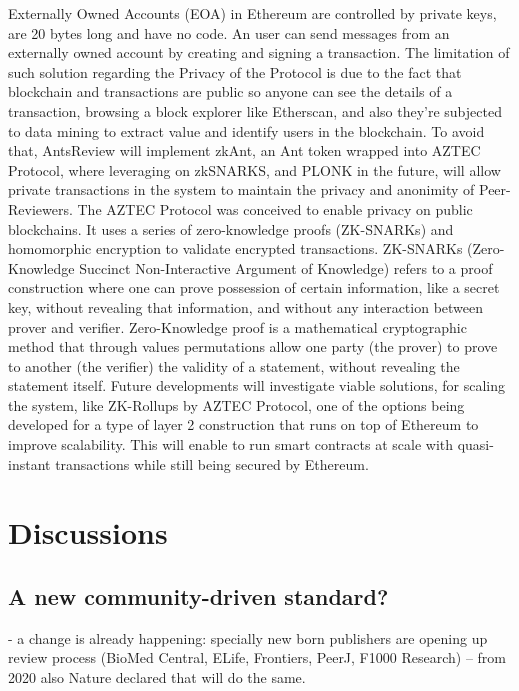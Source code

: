 \documentclass[runningheads]{llncs}
\begin{document}
 Externally Owned Accounts (EOA) in Ethereum are controlled by private keys, are 20 bytes long and have no code. An user can send messages from an externally owned account by creating and signing a transaction.
\newline The limitation of such solution regarding the Privacy of the Protocol is due to the fact that blockchain and transactions are public so anyone can see the details of a transaction, browsing a block explorer like Etherscan, and also they're subjected to data mining to extract value and identify users in the blockchain.
\newline To avoid that, AntsReview will implement zkAnt, an Ant token wrapped into AZTEC Protocol, where leveraging on zkSNARKS, and PLONK in the future, will allow private transactions in the system to maintain the privacy and anonimity of Peer-Reviewers.
\newline The AZTEC Protocol was conceived to enable privacy on public blockchains. It uses a series of zero-knowledge proofs (ZK-SNARKs) and homomorphic encryption to validate encrypted transactions.
\newline ZK-SNARKs (Zero-Knowledge Succinct Non-Interactive Argument of Knowledge) \cite{ZKSNARKs} refers to a proof construction where one can prove possession of certain information, like a secret key, without revealing that information, and without any interaction between prover and verifier.
\newline Zero-Knowledge \cite{ZeroKnoledge} proof is a mathematical cryptographic method that through values permutations allow one party (the prover) to prove to another (the verifier) the validity of a statement, without revealing the statement itself.
\newline Future developments will investigate viable solutions, for scaling the system, like ZK-Rollups by AZTEC Protocol, one of the options being developed for a type of layer 2 construction that runs on top of Ethereum to improve scalability. This will enable to run smart contracts at scale with quasi-instant transactions while still being secured by Ethereum.

\section{Discussions}
\subsection{A new community-driven standard?}
- a change is already happening: specially new born publishers are opening up review process (BioMed Central, ELife, Frontiers, PeerJ, F1000 Research) -- from 2020 also Nature declared that will do the same.
\end{document}
